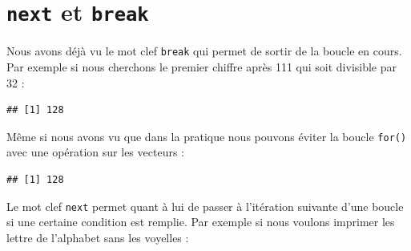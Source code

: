 \documentclass[]{book}
\newenvironment{Shaded}{\begin{snugshade}}{\end{snugshade}}
\newcommand{\ControlFlowTok}[1]{\textcolor[rgb]{0.13,0.29,0.53}{\textbf{#1}}}
\newcommand{\DecValTok}[1]{\textcolor[rgb]{0.00,0.00,0.81}{#1}}
\newcommand{\KeywordTok}[1]{\textcolor[rgb]{0.13,0.29,0.53}{\textbf{#1}}}
\newcommand{\NormalTok}[1]{#1}
\newcommand{\OperatorTok}[1]{\textcolor[rgb]{0.81,0.36,0.00}{\textbf{#1}}}
\newcommand{\StringTok}[1]{\textcolor[rgb]{0.31,0.60,0.02}{#1}}
\begin{document}
\hypertarget{l17spe}{%
\section{\texorpdfstring{\texttt{next} et \texttt{break}}{next et break}}\label{l17spe}}

Nous avons déjà vu le mot clef \texttt{break} qui permet de sortir de la boucle en cours. Par exemple si nous cherchons le premier chiffre après 111 qui soit divisible par 32 :

\begin{Shaded}
\end{Shaded}

\begin{verbatim}
## [1] 128
\end{verbatim}

Même si nous avons vu que dans la pratique nous pouvons éviter la boucle \texttt{for()} avec une opération sur les vecteurs :

\begin{Shaded}
\end{Shaded}

\begin{verbatim}
## [1] 128
\end{verbatim}

Le mot clef \texttt{next} permet quant à lui de passer à l'itération suivante d'une boucle si une certaine condition est remplie. Par exemple si nous voulons imprimer les lettre de l'alphabet sans les voyelles :

\begin{Shaded}
\end{Shaded}
\end{document}
